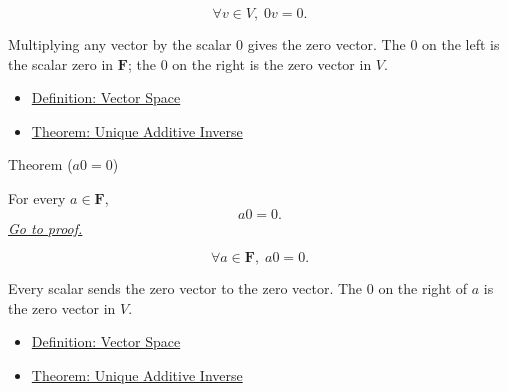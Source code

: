\begin{remark*}
\[
\forall v \in V,\; 0v=0.
\]
\end{remark*}

\begin{remark*}[Interpretation]
Multiplying any vector by the scalar $0$ gives the zero vector. The $0$ on the
left is the scalar zero in $\mathbf{F}$; the $0$ on the right is the zero vector
in $V$.
\end{remark*}

\begin{dependencies}
\begin{itemize}
  \item \hyperref[def:vector-space]{Definition: Vector Space}
  \item \hyperref[thm:unique-additive-inverse]{Theorem: Unique Additive Inverse}
\end{itemize}
\end{dependencies}


\begin{theorembox}{Theorem ($a0=0$)}
\begin{theorem}[$a0=0$]
\label{thm:scalar-times-zero-vector}
For every $a \in \mathbf{F}$,
\[
a0=0.
\]
\hyperref[prf:scalar-times-zero-vector]{\textit{Go to proof.}}
\end{theorem}
\end{theorembox}

\begin{remark*}
\[
\forall a \in \mathbf{F},\; a0=0.
\]
\end{remark*}

\begin{remark*}[Interpretation]
Every scalar sends the zero vector to the zero vector. The $0$ on the right of
$a$ is the zero vector in $V$.
\end{remark*}

\begin{dependencies}
\begin{itemize}
  \item \hyperref[def:vector-space]{Definition: Vector Space}
  \item \hyperref[thm:unique-additive-inverse]{Theorem: Unique Additive Inverse}
\end{itemize}
\end{dependencies}


